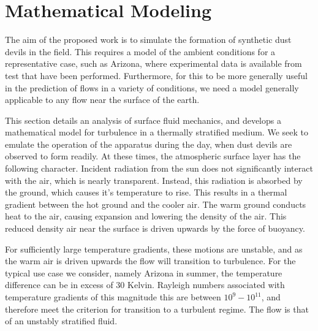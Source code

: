 \section{Mathematical Modeling}
\label{sec:mathmodel}


%
%

The aim of the proposed work is to simulate the formation of synthetic
dust devils in the field. This requires a model of the ambient
conditions for a representative case, such as Arizona, where
experimental data is available from test that have been
performed. Furthermore, for this to be more generally useful in the
prediction of flows in a variety of conditions, we need a model generally
applicable to any flow near the surface of the earth.  

This section details an analysis of surface fluid mechanics, and
develops a mathematical model for turbulence in a thermally stratified
medium. We seek to emulate the operation of the apparatus during the day, 
when dust devils are observed to form readily. 
At these times, the atmospheric surface layer has the following character. 
Incident radiation from the sun does not significantly interact with the
air, which is nearly transparent. Instead, this radiation is absorbed by
the ground, which causes it's temperature to rise. This results in a thermal
gradient between the hot ground and the cooler air. The warm ground
conducts heat to the air, causing expansion and lowering the density
of the air. This reduced density air near the surface is driven upwards
by the force of buoyancy.  

For sufficiently large temperature gradients, these motions are
unstable, and as the warm air is driven upwards the flow will transition
to turbulence. For the typical use case we consider, namely Arizona in
summer, the temperature difference can be in excess of 30 Kelvin. 
Rayleigh numbers associated with temperature gradients of this magnitude
this are between $10^{9} - 10^{11}$, and therefore meet the criterion
for transition to a turbulent regime. The flow is that of an unstably
stratified fluid.  


